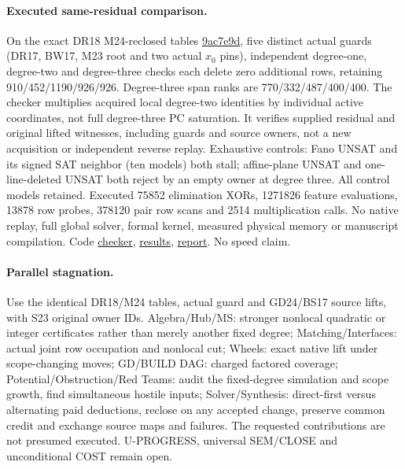 \documentclass[11pt]{article}
\begin{document}
\paragraph{Executed same-residual comparison.}
On the exact DR18 M24-reclosed tables \href{https://github.com/j15marti/pnp/commit/9ac7e9d745b7220f0634990bd08d919313471f82}{9ac7e9d}, five distinct actual guards (DR17, BW17, M23 root and two actual $x_0$ pins), independent degree-one, degree-two and degree-three checks each delete zero additional rows, retaining 910/452/1190/926/926. Degree-three span ranks are 770/332/487/400/400. The checker multiplies acquired local degree-two identities by individual active coordinates, not full degree-three PC saturation. It verifies supplied residual and original lifted witnesses, including guards and source owners, not a new acquisition or independent reverse replay. Exhaustive controls: Fano UNSAT and its signed SAT neighbor (ten models) both stall; affine-plane UNSAT and one-line-deleted UNSAT both reject by an empty owner at degree three. All control models retained. Executed 75852 elimination XORs, 1271826 feature evaluations, 13878 row probes, 378120 pair row scans and 2514 multiplication calls. No native replay, full global solver, formal kernel, measured physical memory or manuscript compilation. Code \href{https://github.com/j15marti/pnp/commit/661e832c28a36530fafe96fdc64216265430956a}{checker}, \href{https://github.com/j15marti/pnp/commit/54dc413690b25a4a4318833befa3cc139d70d64d}{results}, \href{https://github.com/j15marti/pnp/commit/76cebdff5204729ce93f7f465632d139b27c7237}{report}. No speed claim.
\paragraph{Parallel stagnation.}
Use the identical DR18/M24 tables, actual guard and GD24/BS17 source lifts, with S23 original owner IDs. Algebra/Hub/MS: stronger nonlocal quadratic or integer certificates rather than merely another fixed degree; Matching/Interfaces: actual joint row occupation and nonlocal cut; Wheels: exact native lift under scope-changing moves; GD/BUILD DAG: charged factored coverage; Potential/Obstruction/Red Teams: audit the fixed-degree simulation and scope growth, find simultaneous hostile inputs; Solver/Synthesis: direct-first versus alternating paid deductions, reclose on any accepted change, preserve common credit and exchange source maps and failures. The requested contributions are not presumed executed. U-PROGRESS, universal SEM/CLOSE and unconditional COST remain open.
\end{document}
